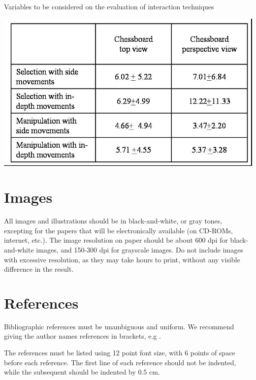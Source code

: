 \documentclass[12pt]{article}
\begin{document}
\begin{table}[ht]
\centering
\caption{Variables to be considered on the evaluation of interaction
  techniques}
\label{tab:exTable1}
\includegraphics[width=.7\textwidth]{table.jpg}
\end{table}

\section{Images}

All images and illustrations should be in black-and-white, or gray tones,
excepting for the papers that will be electronically available (on CD-ROMs,
internet, etc.). The image resolution on paper should be about 600 dpi for
black-and-white images, and 150-300 dpi for grayscale images.  Do not include
images with excessive resolution, as they may take hours to print, without any
visible difference in the result. 

\section{References}

Bibliographic references must be unambiguous and uniform.  We recommend giving
the author names references in brackets, e.g \cite{boulic:91}.

The references must be listed using 12 point font size, with 6 points of space
before each reference. The first line of each reference should not be
indented, while the subsequent should be indented by 0.5 cm.



\end{document}
